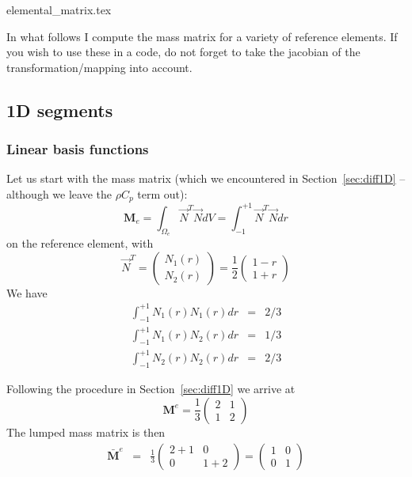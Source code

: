 \begin{flushright} {\tiny {\color{gray} elemental\_matrix.tex}} \end{flushright}

In what follows I compute the mass matrix for a variety of reference elements.
If you wish to use these in a code, do not forget to take the jacobian 
of the transformation/mapping into account. 

\subsection{1D segments}

\subsubsection{Linear basis functions}

Let us start with the mass matrix (which we encountered in 
Section~\ref{sec:diff1D} -- although we leave the $\rho C_p$ term out):
\begin{equation}
{\bm M}_e=\int_{\Omega_e} \vec{N}^T \vec{N} dV
= \int_{-1}^{+1} \vec{N}^T \vec{N} dr
\end{equation}
on the reference element, with 
\[
{\vec N}^T = 
\left(
\begin{array}{c}
N_1(r) \\ N_2(r)
\end{array}
\right)
=
\frac{1}{2}
\left(
\begin{array}{c}
1-r \\ 1+r
\end{array}
\right)
\]
We have 
\begin{eqnarray}
\int_{-1}^{+1} N_1(r) N_1(r) dr &=& 2/3 \\ 
\int_{-1}^{+1} N_1(r) N_2(r) dr &=& 1/3 \\
\int_{-1}^{+1} N_2(r) N_2(r) dr &=& 2/3
\end{eqnarray}

Following the procedure in Section~\ref{sec:diff1D} we arrive at
\[
{\bm M}^e= \frac{1}{3} 
\left(
\begin{array}{cc}
2  & 1 \\
1 & 2
\end{array}
\right)
\]
The lumped mass matrix is then
\begin{eqnarray}
\bar{\bm M}^e 
&=&
\frac{1}{3}
\left(
\begin{array}{cc}
2+1  & 0 \\
0 & 1+2
\end{array}
\right)
=
\left(
\begin{array}{cc}
1  & 0 \\
0 & 1
\end{array}
\right)
\end{eqnarray}


